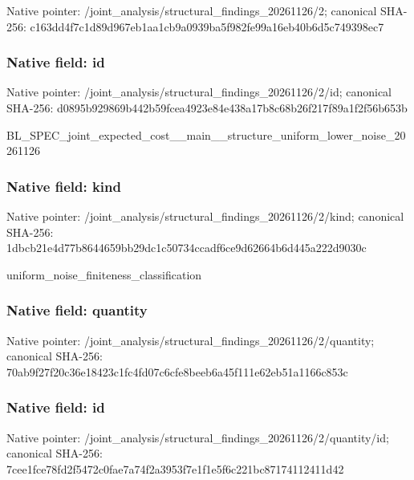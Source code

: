 \documentclass[10pt,a4paper]{article}
\begin{document}
Native pointer: /joint\_analysis/structur\allowbreak{}al\_findings\_20261126/2; canonical SHA-256: c163dd4f7c1d89d967eb1aa1\allowbreak{}cb9a0939ba5f982fe99a16eb\allowbreak{}40b6d5c749398ec7



\subsubsection{Native field: id}


Native pointer: /joint\_analysis/structur\allowbreak{}al\_findings\_20261126/2/i\allowbreak{}d; canonical SHA-256: d0895b929869b442b59fcea4\allowbreak{}923e84e438a17b8c68b26f21\allowbreak{}7f89a1f2f56b653b


BL\_SPEC\_joint\_expected\_c\allowbreak{}ost\_\_main\_\_structure\_uni\allowbreak{}form\_lower\_noise\_2026112\allowbreak{}6


\subsubsection{Native field: kind}


Native pointer: /joint\_analysis/structur\allowbreak{}al\_findings\_20261126/2/k\allowbreak{}ind; canonical SHA-256: 1dbcb21e4d77b8644659bb29\allowbreak{}dc1c50734ccadf6ce9d62664\allowbreak{}b6d445a222d9030c


uniform\_noise\_finiteness\_classification


\subsubsection{Native field: quantity}


Native pointer: /joint\_analysis/structur\allowbreak{}al\_findings\_20261126/2/q\allowbreak{}uantity; canonical SHA-256: 70ab9f27f20c36e18423c1fc\allowbreak{}4fd07c6cfe8beeb6a45f111e\allowbreak{}62eb51a1166c853c



\subsubsection{Native field: id}


Native pointer: /joint\_analysis/structur\allowbreak{}al\_findings\_20261126/2/q\allowbreak{}uantity/id; canonical SHA-256: 7cee1fce78fd2f5472c0fae7\allowbreak{}a74f2a3953f7e1f1e5f6c221\allowbreak{}bc87174112411d42
\end{document}
